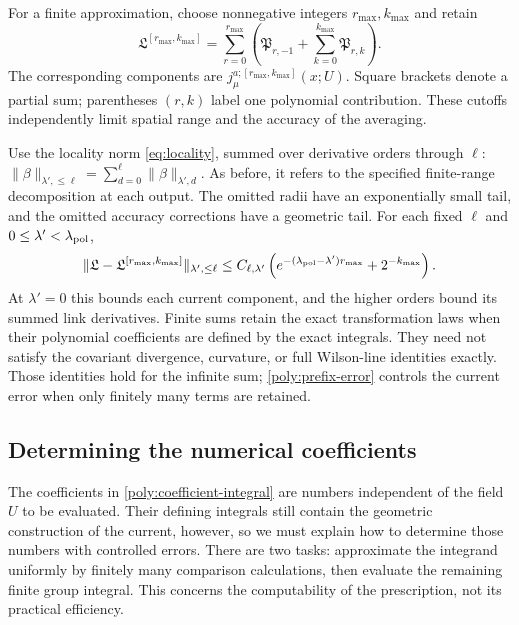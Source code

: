 \documentclass[11pt,a4paper]{article}
\theoremstyle{remark}
\begin{document}
For a finite approximation, choose nonnegative integers
$r_{\max},k_{\max}$ and retain
\begin{equation}
 \mathfrak L^{[r_{\max},k_{\max}]}
   =\sum_{r=0}^{r_{\max}}\left(\mathfrak P_{r,-1}
                       +\sum_{k=0}^{k_{\max}}\mathfrak P_{r,k}\right).
\end{equation}
The corresponding components are
$j_\mu^{a;[r_{\max},k_{\max}]}(x;U)$. Square brackets denote a
partial sum; parentheses $(r,k)$ label one polynomial contribution.
These cutoffs independently limit spatial range and the accuracy of
the averaging.

Use the locality norm \eqref{eq:locality}, summed over derivative
orders through $\ell$:
$\|\beta\|_{\lambda',\le\ell}
 =\sum_{d=0}^\ell\|\beta\|_{\lambda',d}$.
As before, it refers to the specified finite-range decomposition at
each output. The omitted radii have an exponentially small tail, and
the omitted accuracy corrections have a geometric tail. For each fixed
$\ell$ and $0\le\lambda'<\lambda_{\rm pol}$,
\begin{equation}
 \|\mathfrak L-\mathfrak L^{[r_{\max},k_{\max}]}\|_{\lambda',\leq\ell}
 \leq C_{\ell,\lambda'}
       \left(e^{-(\lambda_{\rm pol}-\lambda')r_{\max}}+2^{-k_{\max}}\right).
 \label{poly:prefix-error}
\end{equation}
At $\lambda'=0$ this bounds each current component, and the higher
orders bound its summed link derivatives. Finite sums retain the exact
transformation laws when their polynomial coefficients are defined by
the exact integrals. They need not satisfy the covariant divergence,
curvature, or full Wilson-line identities exactly. Those identities
hold for the infinite sum; \eqref{poly:prefix-error} controls the
current error when only finitely many terms are retained.

\subsection{Determining the numerical coefficients}

The coefficients in \eqref{poly:coefficient-integral} are numbers
independent of the field $U$ to be evaluated. Their defining integrals
still contain the geometric construction of the current, however, so
we must explain how to determine those numbers with controlled errors.
There are two tasks: approximate the integrand uniformly by finitely
many comparison calculations, then evaluate the remaining finite group
integral. This concerns the computability of the prescription, not its
practical efficiency.
\end{document}
